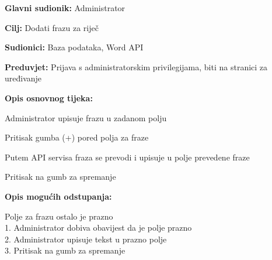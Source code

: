 					\noindent {}
					\begin{packed_item}
						\item \textbf{Glavni sudionik:} Administrator
						\item \textbf{Cilj:} Dodati frazu za riječ
						\item \textbf{Sudionici:} Baza podataka, Word API
						\item \textbf{Preduvjet:} Prijava s administratorskim privilegijama, biti na stranici za uređivanje
						\item \textbf{Opis osnovnog tijeka:}
						\begin{packed_enum}
							\item Administrator upisuje frazu u zadanom polju
							\item Pritisak gumba (+) pored polja za fraze
							\item Putem API servisa fraza se prevodi i upisuje u polje prevedene fraze
							\item Pritisak na gumb za spremanje
						\end{packed_enum}
						\item \textbf{Opis mogućih odstupanja:}
						\begin{packed_item}
							\item [4.a] Polje za frazu ostalo je prazno
							\\1. Administrator dobiva obavijest da je polje prazno
							\\2. Administrator upisuje tekst u prazno polje
							\\3. Pritisak na gumb za spremanje
						\end{packed_item}
					\end{packed_item}
					
